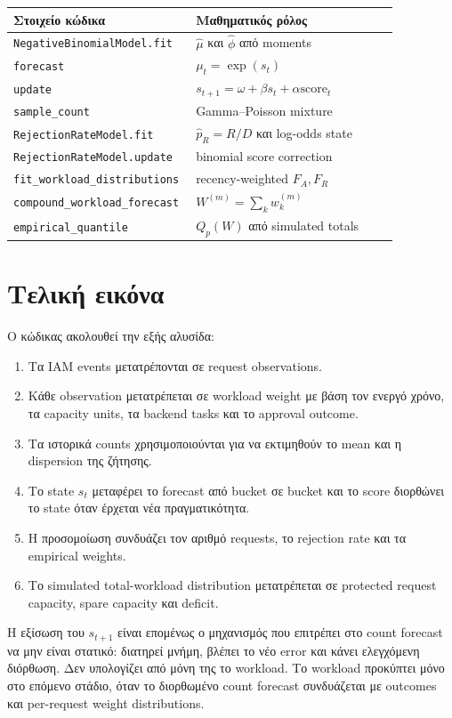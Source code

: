 \documentclass[11pt,a4paper]{article}
\newcommand{\code}[1]{\texttt{#1}}
\begin{document}
\begin{center}
\begin{tabular}{p{0.35\linewidth}p{0.51\linewidth}}
\toprule
\textbf{Στοιχείο κώδικα} & \textbf{Μαθηματικός ρόλος}\\
\midrule
\code{NegativeBinomialModel.fit} & $\hat{\mu}$ και $\hat{\phi}$ από moments\\
\code{forecast} & $\mu_t=\exp(s_t)$\\
\code{update} & $s_{t+1}=\omega+\beta s_t+\alpha\text{score}_t$\\
\code{sample\_count} & Gamma--Poisson mixture\\
\code{RejectionRateModel.fit} & $\hat{p}_R=R/D$ και log-odds state\\
\code{RejectionRateModel.update} & binomial score correction\\
\code{fit\_workload\_distributions} & recency-weighted $F_A,F_R$\\
\code{compound\_workload\_forecast} & $W^{(m)}=\sum_k w_k^{(m)}$\\
\code{empirical\_quantile} & $Q_p(W)$ από simulated totals\\
\bottomrule
\end{tabular}
\end{center}

\section{Τελική εικόνα}

Ο κώδικας ακολουθεί την εξής αλυσίδα:

\begin{enumerate}
  \item Τα IAM events μετατρέπονται σε request observations.
  \item Κάθε observation μετατρέπεται σε workload weight με βάση τον ενεργό
        χρόνο, τα capacity units, τα backend tasks και το approval outcome.
  \item Τα ιστορικά counts χρησιμοποιούνται για να εκτιμηθούν το mean και η
        dispersion της ζήτησης.
  \item Το state $s_t$ μεταφέρει το forecast από bucket σε bucket και το
        score διορθώνει το state όταν έρχεται νέα πραγματικότητα.
  \item Η προσομοίωση συνδυάζει τον αριθμό requests, το rejection rate και
        τα empirical weights.
  \item Το simulated total-workload distribution μετατρέπεται σε protected
        request capacity, spare capacity και deficit.
\end{enumerate}

Η εξίσωση του $s_{t+1}$ είναι επομένως ο μηχανισμός που επιτρέπει στο count
forecast να μην είναι στατικό: διατηρεί μνήμη, βλέπει το νέο error και κάνει
ελεγχόμενη διόρθωση. Δεν υπολογίζει από μόνη της το workload. Το workload
προκύπτει μόνο στο επόμενο στάδιο, όταν το διορθωμένο count forecast
συνδυάζεται με outcomes και per-request weight distributions.
\end{document}
